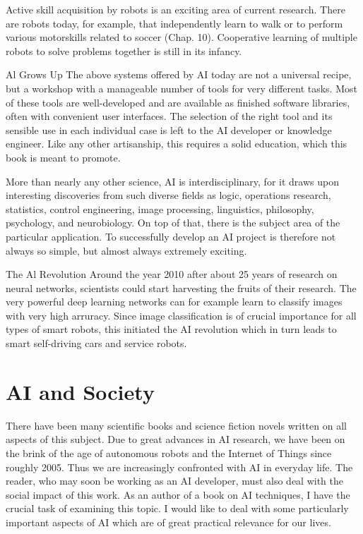 \documentclass[10pt]{book}
\begin{document}
Active skill acquisition by robots is an exciting area of current research. There are robots today, for example, that independently learn to walk or to perform\\
various motorskills related to soccer (Chap. 10). Cooperative learning of multiple robots to solve problems together is still in its infancy.


Al Grows Up
The above systems offered by AI today are not a universal recipe, but a workshop with a manageable number of tools for very different tasks. Most of these tools are well-developed and are available as finished software libraries, often with convenient user interfaces. The selection of the right tool and its sensible use in each individual case is left to the AI developer or knowledge engineer. Like any other artisanship, this requires a solid education, which this book is meant to promote.

More than nearly any other science, AI is interdisciplinary, for it draws upon interesting discoveries from such diverse fields as logic, operations research, statistics, control engineering, image processing, linguistics, philosophy, psychology, and neurobiology. On top of that, there is the subject area of the particular application. To successfully develop an AI project is therefore not always so simple, but almost always extremely exciting.

The Al Revolution
Around the year 2010 after about 25 years of research on neural networks, scientists could start harvesting the fruits of their research. The very powerful deep learning networks can for example learn to classify images with very high arruracy. Since image classification is of crucial importance for all types of smart robots, this initiated the AI revolution which in turn leads to smart self-driving cars and service robots.

\section{AI and Society}
There have been many scientific books and science fiction novels written on all aspects of this subject. Due to great advances in AI research, we have been on the brink of the age of autonomous robots and the Internet of Things since roughly 2005. Thus we are increasingly confronted with AI in everyday life. The reader, who may soon be working as an AI developer, must also deal with the social impact of this work. As an author of a book on AI techniques, I have the crucial task of examining this topic. I would like to deal with some particularly important aspects of AI which are of great practical relevance for our lives.
\end{document}
